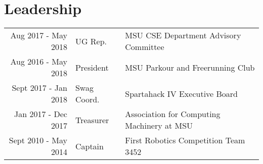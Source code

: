 \documentclass[]{deedy-resume-openfont-rileyannis}
\begin{document}
\begin{minipage}[t]{0.66\textwidth}
\section{Leadership} 

\begin{tabular}{rll}
Aug 2017 - May 2018 & UG Rep. & MSU CSE Department Advisory Committee\\
Aug 2016 - May 2018 & President & MSU Parkour and Freerunning Club\\
Sept 2017 - Jan 2018 & Swag Coord. & Spartahack IV Executive Board\\
Jan 2017 - Dec 2017 & Treasurer & Association for Computing Machinery at MSU\\
Sept 2010 - May 2014 & Captain & First Robotics Competition Team 3452\\
\end{tabular}
\sectionsep

\end{minipage} 
\end{document}
